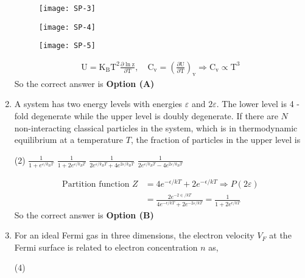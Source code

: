 \begin{enumerate}
\begin{tasks}
\begin{figure}[H]
	\centering
	\texttt{[image: SP-3]}
\end{figure}
\task[\textbf{C.}] \begin{figure}[H]
	\centering
	\texttt{[image: SP-4]}
\end{figure}
\task[\textbf{D.}] \begin{figure}[H]
	\centering
	\texttt{[image: SP-5]}
\end{figure}
\end{tasks}
\begin{answer}
\begin{align*}
\mathrm{U}=\mathrm{K}_{\mathrm{B}} \mathrm{T}^{2} \frac{\partial \ln \mathrm{z}}{\partial \mathrm{T}}, \quad \mathrm{C}_{\mathrm{v}}=\left(\frac{\partial \mathrm{U}}{\partial \mathrm{T}}\right)_{\mathrm{v}} \Rightarrow \mathrm{C}_{\mathrm{v}} \propto \mathrm{T}^{3}
\end{align*}
So the correct answer is \textbf{Option (A)}
\end{answer}
\item 	A system has two energy levels with energies $\varepsilon$ and $2 \varepsilon .$ The lower level is 4 -fold degenerate while the upper level is doubly degenerate. If there are $N$ non-interacting classical particles in the system, which is in thermodynamic equilibrium at a temperature $T$, the fraction of particles in the upper level is
\begin{tasks}(2)
\task[\textbf{A.}] $\frac{1}{1+e^{\varepsilon / k_{B} T}}$
\task[\textbf{B.}] $\frac{1}{1+2 e^{\varepsilon / k_{B} T}}$
\task[\textbf{C.}] $\frac{1}{2 e^{\varepsilon / k_{B} T}+4 e^{2 \varepsilon / k_{B} T}}$
\task[\textbf{D.}] $\frac{1}{2 e^{\varepsilon / k_{B} T}-4 e^{2 \varepsilon / k_{B} T}}$
\end{tasks}
\begin{answer}
\begin{align*}
\text{Partition function }Z&=4 e^{-\epsilon / k T}+2 e^{-\epsilon / k T} \Rightarrow P(2 \varepsilon)\\&=\frac{2 e^{-2 \in / k T}}{4 e^{-\epsilon / k T}+2 e^{-2 \varepsilon / k T}}=\frac{1}{1+2 e^{\epsilon / k T}}
\end{align*}
So the correct answer is \textbf{Option (B)}
\end{answer}
\item 	For an ideal Fermi gas in three dimensions, the electron velocity $V_{F}$ at the Fermi surface is related to electron concentration $n$ as,
\begin{tasks}(4)

\end{tasks}
\end{enumerate}
